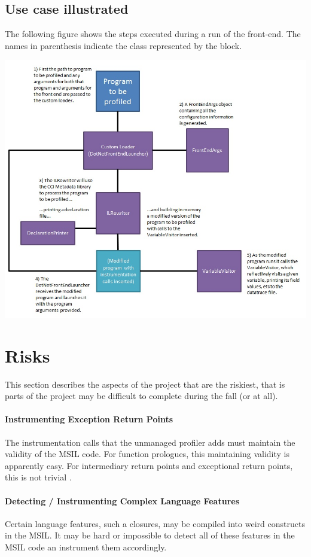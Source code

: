 \documentclass{article}
\begin{document}
\subsection{Use case illustrated}
The following figure shows the steps executed during a run of the front-end. The names in parenthesis indicate the class represented by the block.

\includegraphics[scale=.7]{SequenceDiagram.jpg}

\section{Risks}
This section describes the aspects of the project that are the riskiest, that is parts of the project may be difficult to complete during the fall (or at all).

\paragraph{Instrumenting Exception Return Points}
The instrumentation calls that the unmanaged profiler adds must maintain the validity of the MSIL code. For function prologues, this maintaining validity is apparently easy. For intermediary return points and exceptional return points, this is not trivial \cite{Mikunov:2003:Online}.

\paragraph{Detecting / Instrumenting Complex Language Features}
Certain language features, such a closures, may be compiled into weird
constructs in the MSIL. It may be hard or impossible to detect all of
these features in the MSIL code an instrument them accordingly.
\end{document}

